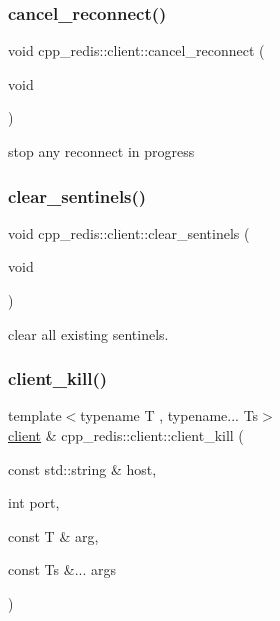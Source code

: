 \subsubsection{\texorpdfstring{cancel\+\_\+reconnect()}{cancel\_reconnect()}}
{\footnotesize\ttfamily void cpp\+\_\+redis\+::client\+::cancel\+\_\+reconnect (\begin{DoxyParamCaption}\item[{void}]{ }\end{DoxyParamCaption})}

stop any reconnect in progress \mbox{\label{classcpp__redis_1_1client_a68cd15d1cc30302237e3a400e2ac43f5}} 
\subsubsection{\texorpdfstring{clear\+\_\+sentinels()}{clear\_sentinels()}}
{\footnotesize\ttfamily void cpp\+\_\+redis\+::client\+::clear\+\_\+sentinels (\begin{DoxyParamCaption}\item[{void}]{ }\end{DoxyParamCaption})}

clear all existing sentinels. \mbox{\label{classcpp__redis_1_1client_ae4090830d1710276c33ff5a74eba2e4b}} 
\subsubsection{\texorpdfstring{client\+\_\+kill()}{client\_kill()}}
{\footnotesize\ttfamily template$<$typename T , typename... Ts$>$ \\
\hyperlink{classcpp__redis_1_1client}{client} \& cpp\+\_\+redis\+::client\+::client\+\_\+kill (\begin{DoxyParamCaption}\item[{const std\+::string \&}]{host,  }\item[{int}]{port,  }\item[{const T \&}]{arg,  }\item[{const Ts \&...}]{args }\end{DoxyParamCaption})\hspace{0.3cm}{\ttfamily [inline]}}

